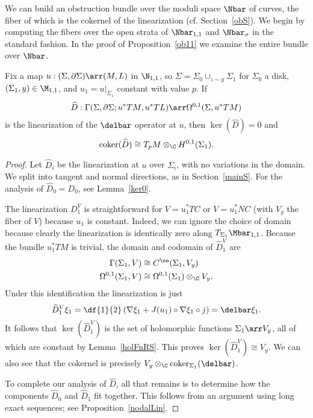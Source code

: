 We can build an obstruction bundle over the moduli space $\Nbar$ of curves, the fiber of which is the cokernel of the linearization (cf. Section~\ref{obS}). We begin by computing the fibers over the open strata of $\Nbar_{1,1}$ and $\Nbar_\sigma$ in the standard fashion. In the proof of Proposition~\ref{ob11} we examine the entire bundle over $\Nbar$.

\begin{lemma} \label{ob11torus}
Fix a map $u:(\Sigma,\partial\Sigma) \arr (M,L)$ in $\N_{1,1}$, so $\Sigma = \Sigma_0 \cup_{z \sim y} \Sigma_1$ for $\Sigma_0$ a disk, $(\Sigma_1,y) \in \M_{1,1}$, and $u_1=u|_{\Sigma_1}$ constant with value $p$. If
\[
\hat{D}:\Gamma(\Sigma,\partial\Sigma;u^*TM,u^*TL) \arr \Omega^{0,1}(\Sigma,u^*TM)
\]
is the linearization of the $\delbar$ operator at $u$, then $\ker(\hat{D})=0$ and
\[
\coker(\hat{D}) \cong T_pM \otimes_\C H^{0,1}(\Sigma_1).
\]
\begin{proof}
Let $\hat{D}_i$ be the linearization at $u$ over $\Sigma_i$, with no variations in the domain. We split into tangent and normal directions, as in Section~\ref{mainS}. For the analysis of $\hat{D}_0=D_0$, see Lemma~\ref{ker0}.

The linearization $D_1^V$ is straightforward for $V=u_1^*TC$ or $V=u_1^*NC$ (with $V_y$ the fiber of $V$) because $u_1$ is constant. Indeed, we can ignore the choice of domain because clearly the linearization is identically zero along $T_{\Sigma_1}\Mbar_{1,1}$. Because the bundle $u_1^*TM$ is trivial, the domain and codomain of $\hat{D}_1^V$ are
\begin{align*}
\Gamma(\Sigma_1,V) & \cong C^\oo(\Sigma_1, V_y)
\\
\Omega^{0,1}(\Sigma_1,V) & \cong \Omega^{0,1}(\Sigma_1) \otimes_\C V_y.
\end{align*}
Under this identification the linearization is just
\[
\hat{D}_1^V\xi_1 = \df{1}{2}\left( \nabla\xi_1+J(u_1) \circ \nabla\xi_1 \circ j \right) = \delbar\xi_1.
\]
It follows that $\ker(\hat{D}_1^V)$ is the set of holomorphic functions $\Sigma_1 \arr V_y$, all of which are constant by Lemma~\ref{holFnRS}. This proves $\ker(\hat{D}_1^V) \cong V_y$. We can also see that the cokernel is precisely $V_y \otimes_\C \coker_{\Sigma_1}(\delbar)$.

To complete our analysis of $\hat{D}$, all that remains is to determine how the components $\hat{D}_0$ and $\hat{D}_1$ fit together. This follows from an argument using long exact sequences; see Proposition~\ref{nodalLin}.
\end{proof}
\end{lemma}

